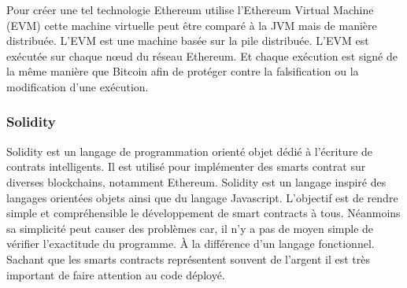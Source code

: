 Pour créer une tel technologie Ethereum utilise l'Ethereum Virtual Machine (EVM) cette machine virtuelle peut être comparé à la JVM mais de manière distribuée.
L'EVM est une machine basée sur la pile distribuée.
L'EVM est exécutée sur chaque nœud du réseau Ethereum. Et chaque exécution est signé de la même manière que Bitcoin afin de protéger contre la falsification
ou la modification d'une exécution.

\subsubsection{Solidity}

Solidity est un langage de programmation orienté objet dédié à l'écriture de contrats intelligents. Il est utilisé pour implémenter des smarts contrat sur diverses 
blockchains, notamment Ethereum. Solidity est un langage inspiré des langages orientées objets ainsi que du langage Javascript. L'objectif est de rendre simple et
compréhensible le développement de smart contracts à tous. Néanmoins sa simplicité peut causer des problèmes car, il n'y a pas de moyen simple de vérifier 
l'exactitude du programme. À la différence d'un langage fonctionnel. Sachant que les smarts contracts représentent souvent de l'argent il est très important
de faire attention au code déployé.
